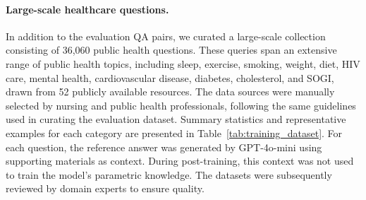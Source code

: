 \paragraph{Large-scale healthcare questions.}
In addition to the evaluation QA pairs, we curated a large-scale collection consisting of 36,060 public health questions.
These queries span an extensive range of public health topics, including sleep, exercise, smoking, weight, diet, HIV care, mental health, cardiovascular disease, diabetes, cholesterol, and SOGI, drawn from 52 publicly available resources.
The data sources were manually selected by nursing and public health professionals, following the same guidelines used in curating the evaluation dataset.
Summary statistics and representative examples for each category are presented in Table~\ref{tab:training_dataset}. For each question, the reference answer was generated by GPT-4o-mini using supporting materials as context. During post-training, this context was not used to train the model’s parametric knowledge. The datasets were subsequently reviewed by domain experts to ensure quality.


